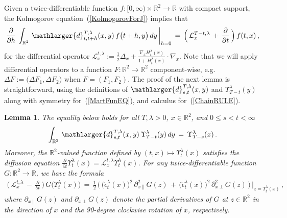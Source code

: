 \documentclass[10pt]{article}
\numberwithin{equation}{section}
\newtheorem{lemma}[theorem]{Lemma}
\theoremstyle{definition}
\newcommand{\R}{{\mathbb R}}
\newcommand{\Rphi}{{\Upsilon}}
\begin{document}
\begin{appendix}
Given a  twice-differentiable function  $f:[0,\infty)\times \R^2\rightarrow \R$ with compact support, the  Kolmogorov equation~(\ref{KolmogorovForJ}) implies that
\begin{align}\label{KolmogorovForJBack}
\frac{\partial}{\partial h} \,\int_{\R^2}\, \mathlarger{d}_{t,t+h}^{T,\lambda}(x,y)\, f\big(t+h,y\big)\,dy\,\bigg|_{h=0}\,=\, 
 \Big(\,\mathcal{L}^{T-t,\lambda}_x  \,+\,\frac{\partial}{\partial t}\,\Big) \,f(t,x) \,,  
\end{align}
 for the differential operator $\mathcal{L}^{t,\lambda}_x :=\frac{1}{2}\Delta_x +\frac{ \nabla_x H_{t}^{\lambda}(x)   }{ 1+H_{t}^{\lambda}(x)   }\cdot \nabla_x$.  Note that we will apply differential operators to a function $F:\R^2\rightarrow \R^2$ component-wise, e.g.\  $\Delta F:=\big(\Delta F_1, \Delta F_2\big)$ when  $F=(F_1,F_2)$. The proof of the next lemma  is  straightforward, using  the definitions of $\mathlarger{d}_{s,t}^{T,\lambda}(x,y)$ and $\Rphi_{T-t}^{\lambda}(y)$ along with symmetry for~(\ref{MartFunEQ}), and  calculus for~(\ref{ChainRULE}). 
\begin{lemma}\label{LemmaMartFUN} The equality below holds for all $T,\lambda>0$, $x\in \R^2$, and $0\leq s<t<\infty$
\begin{align}\label{MartFunEQ}
    \int_{\R^2}  \,\mathlarger{d}_{s,t}^{T,\lambda}(x,y) \,\Rphi_{T-t}^{\lambda}(y)\,dy\,=\,\Rphi_{T-s}^{\lambda}(x)\,.
\end{align}
Moreover, the $\R^2$-valued function  defined by $(t,x)\mapsto \Rphi_{t}^{\lambda}(x)$ satisfies the diffusion equation $\frac{\partial }{\partial t}\Rphi_{t}^{\lambda}(x)=\mathcal{L}^{t,\lambda}_x\Rphi_{t}^{\lambda}(x)$.  For any twice-differentiable function $G:\R^2\rightarrow \R$, we have the formula
\begin{align}\label{ChainRULE}
\Big( \, \mathcal{L}_{x}^{t,\lambda}  \,  -\,\frac{\partial}{\partial t}\,\Big) \, G\big(\Rphi_{t}^{\lambda}(x)  \big)  \,=\,\frac{1}{2}\,\Big(\,\big( \check{\epsilon}_{t}^{\lambda}(x) \big)^2 \, \partial_{x\parallel }^2G(z) \,+\,\big( \hat{\epsilon}_{t}^{\lambda}(x) \big)^2\,\partial_{x\perp}^2G(z) \,\Big)\,\bigg|_{z= \Rphi_{t}^{\lambda}(x)}\,,
\end{align}
where $\partial_{x\parallel}G(z)$ and $\partial_{x\perp}G(z)$  denote the partial derivatives of $G$ at $z\in \R^2$ in the direction of $x$ and  the 90-degree clockwise rotation of $x$, respectively.  
\end{lemma}






\end{appendix}
\end{document}
